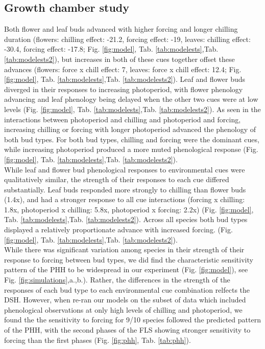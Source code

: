 \documentclass[11pt]{article}\usepackage[]{graphicx}\usepackage[]{color}
\begin{document}
\subsection*{Growth chamber study} 
\noindent  Both flower and leaf buds advanced with higher forcing and longer chilling duration (flowers: chilling effect: -21.2, forcing effect: -19, leaves: chilling effect: -30.4, forcing effect: -17.8; Fig. \ref{fig:model}, Tab. \ref{tab:modelests},Tab. \ref{tab:modelests2}), but increases in both of these cues together offset these advances (flowers: force x chill effect: 7, leaves: force x chill effect: 12.4; Fig. \ref{fig:model}, Tab. \ref{tab:modelests},Tab. \ref{tab:modelests2}). Leaf and flower buds diverged in their responses to increasing photoperiod, with flower phenology advancing and leaf phenology being delayed when the other two cues were at low levels (Fig. \ref{fig:model}, Tab. \ref{tab:modelests},Tab. \ref{tab:modelests2}). As seen in the interactions between photoperiod and chilling and photoperiod and forcing, increasing chilling or forcing with longer photoperiod advanced the phenology of both bud types. For both bud types, chilling and forcing were the dominant cues, while increasing photoperiod produced a more muted phenological response (Fig. \ref{fig:model}, Tab. \ref{tab:modelests},Tab. \ref{tab:modelests2}). \\

\noindent While leaf and flower bud phenological responses to environmental cues were qualitatively similar, the strength of their responses to each cue differed substantially. Leaf buds responded more strongly to chilling than flower buds (1.4x), and had a stronger response to all cue interactions (forcing x chilling: 1.8x, photoperiod x chilling: 5.8x, photoperiod x forcing: 2.2x) (Fig. \ref{fig:model}, Tab. \ref{tab:modelests},Tab. \ref{tab:modelests2}). Across all species both bud types displayed a relatively proportionate advance with increased forcing. (Fig. \ref{fig:model}, Tab. \ref{tab:modelests},Tab. \ref{tab:modelests2}).\\

\noindent While there was significant variation among species in their strength of their response to forcing between bud types, we did find the characteristic sensitivity pattern of the PHH to be widespread in our experiment (Fig. \ref{fig:model}), see Fig. \ref{fig:simulations},a.,b.). Rather, the differences in the strength of the responses of each bud type to each environmental cue combination relfects the DSH. However, when re-ran our models on the subset of data which included phenological observations at only high levels of chilling and photoperiod, we found the the sensitivity to forcing for 9/10 species followed the predicted pattern of the PHH, with the second phases of the FLS showing stronger sensitivity to forcing than the first phases (Fig. \ref{fig:phh}, Tab. \ref{tab:phh}).\\
\end{document}
